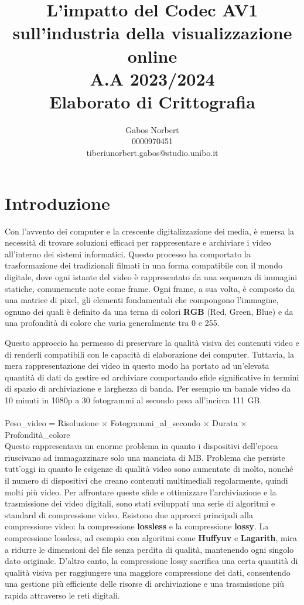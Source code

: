\documentclass[a4paper,12pt, oneside]{article}
\title{\textbf{L'impatto del Codec AV1 sull'industria della visualizzazione online} \\ \large A.A 2023/2024 \\ Elaborato di Crittografia}
\author{Gabos Norbert \\ 0000970451 \\ tiberiunorbert.gabos@studio.unibo.it }
\date{}
\begin{document}
\maketitle

\newpage
\tableofcontents{}
\newpage

\section{Introduzione}
Con l'avvento dei computer e la crescente digitalizzazione dei media, è emersa la necessità di
trovare soluzioni efficaci per rappresentare e archiviare i video all'interno dei sistemi
informatici. Questo processo ha comportato la trasformazione dei tradizionali filmati in una
forma compatibile con il mondo digitale, dove ogni istante del video è rappresentato da una
sequenza di immagini statiche, comunemente note come frame. Ogni frame, a sua volta, è
composto da una matrice di pixel, gli elementi fondamentali che compongono l'immagine, ognuno
dei quali è definito da una terna di colori \textbf{RGB} (Red, Green, Blue) e da una profondità
di colore che varia generalmente tra 0 e 255.

Questo approccio ha permesso di preservare la qualità visiva dei contenuti video e di renderli
compatibili con le capacità di elaborazione dei computer. Tuttavia, la mera rappresentazione
dei video in questo modo ha portato ad un'elevata quantità di dati da gestire ed archiviare
comportando sfide significative in termini di spazio di archiviazione e larghezza di banda.
Per esempio un banale video da 10 minuti in 1080p a 30 fotogrammi al secondo pesa
all'incirca 111 GB.
\noindent
\\\\Peso\_video = Risoluzione × Fotogrammi\_al\_secondo × Durata × Profondità\_colore\\

Questo rappresentava un enorme problema in quanto i dispositivi dell'epoca riuscivano ad
immagazzinare solo una manciata di MB. Problema che persiste tutt'oggi in quanto le esigenze
di qualità video sono aumentate di molto, nonché il numero di dispositivi che creano contenuti
multimediali regolarmente, quindi molti più video.
Per affrontare queste sfide e ottimizzare l'archiviazione e la trasmissione dei video
digitali, sono stati sviluppati una serie di algoritmi e standard di compressione video.
Esistono due approcci principali alla compressione video: la compressione \textbf{lossless} e
la compressione \textbf{lossy}. La compressione lossless, ad esempio con algoritmi come
\textbf{Huffyuv} e \textbf{Lagarith}, mira a ridurre le dimensioni del file senza perdita di
qualità, mantenendo ogni singolo dato originale. D'altro canto, la compressione lossy
sacrifica una certa quantità di qualità visiva per raggiungere una maggiore compressione dei
dati, consentendo una gestione più efficiente delle risorse di archiviazione e una
trasmissione più rapida attraverso le reti digitali.
\end{document}
